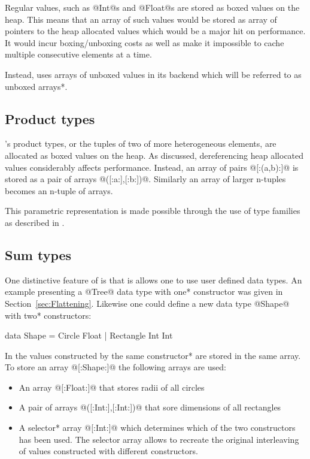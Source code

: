\documentclass[preamble.tex]{subfiles}
\begin{document}
Regular \Haskell values, such as @Int@s and @Float@s are stored as boxed values on the heap. This means that an array of such values would be stored as array of pointers to the heap allocated values which would be a major hit on performance. It would incur boxing/unboxing costs as well as make it impossible to cache multiple consecutive elements at a time.

Instead, \DPH uses arrays of unboxed values in its backend which will be referred to as \*unboxed arrays*.


\subsection{Product types}

\Haskell's product types, or the tuples of two of more heterogeneous elements, are allocated as boxed values on the heap. As discussed, dereferencing heap allocated values considerably affects performance. Instead, an array of pairs @[:(a,b):]@ is stored as a pair of arrays @([:a:],[:b:])@. Similarly an array of larger n-tuples becomes an n-tuple of arrays.

This parametric representation is made possible through the use of type families as described in \cite{CDL09}.


\subsection{Sum types}

One distinctive feature of \DPH is that is allows one to use user defined data types. An example presenting a @Tree@ data type with \*one* constructor was given in Section~\ref{sec:Flattening}. Likewise one could define a new data type @Shape@ with \*two* constructors:

\begin{hscode}
data Shape = Circle Float
           | Rectangle Int Int
\end{hscode}

In \DPH the values constructed by the \*same constructor* are stored in the same array. To store an array @[:Shape:]@ the following arrays are used:
\begin{itemize}
\item An array @[:Float:]@ that stores radii of all circles
\item A pair of arrays @([:Int:],[:Int:])@ that sore dimensions of all rectangles
\item A \*selector* array @[:Int:]@ which determines which of the two constructors has been used. The selector array allows to recreate the original interleaving of values constructed with different constructors.
\end{itemize}
\end{document}
